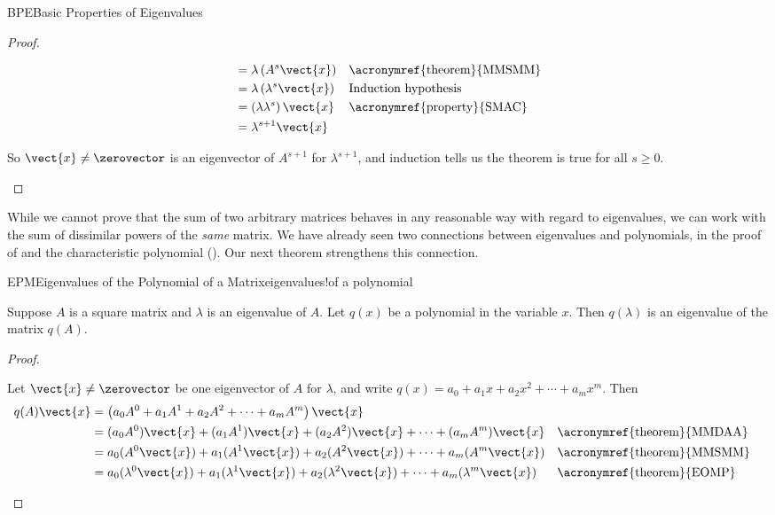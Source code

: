 \begin{subsect}{BPE}{Basic Properties of Eigenvalues}
\begin{proof}
\begin{para}
\begin{align*}
&=\lambda\left(A^s\vect{x}\right)&&\text{\acronymref{theorem}{MMSMM}}\\
&=\lambda\left(\lambda^s\vect{x}\right)&&\text{Induction hypothesis}\\
&=\left(\lambda\lambda^s\right)\vect{x}&&\text{\acronymref{property}{SMAC}}\\
&=\lambda^{s+1}\vect{x}
\end{align*}
\end{para}
%
\begin{para}So $\vect{x}\neq\zerovector$ is an eigenvector of $A^{s+1}$ for $\lambda^{s+1}$, and induction tells us the theorem is true for all $s\geq 0$.\end{para}
%
\end{proof}
%
\begin{para}While we cannot prove that the sum of two arbitrary matrices behaves in any reasonable way with regard to eigenvalues, we can work with the sum of dissimilar powers of the {\em same} matrix.  We have already seen two connections between eigenvalues and polynomials, in the proof of  and the characteristic polynomial ().  Our next theorem strengthens this connection.\end{para}
%
\begin{theorem}{EPM}{Eigenvalues of the Polynomial of a Matrix}{eigenvalues!of a polynomial}
\begin{para}Suppose $A$ is a square matrix and $\lambda$ is an eigenvalue of $A$.  Let $q(x)$ be a polynomial in the variable $x$.  Then $q(\lambda)$ is an eigenvalue of the matrix $q(A)$.\end{para}
\end{theorem}
%
\begin{proof}
%
\begin{para}Let $\vect{x}\neq\zerovector$ be one eigenvector of $A$ for $\lambda$, and write $q(x)=a_0+a_1x+a_2x^2+\cdots+a_mx^m$.  Then
%
\begin{align*}
q(A)\vect{x}&=\left(a_0A^0+a_1A^1+a_2A^2+\cdots+a_mA^m\right)\vect{x}\\
&=(a_0A^0)\vect{x}+(a_1A^1)\vect{x}+(a_2A^2)\vect{x}+\cdots+(a_mA^m)\vect{x}&&\text{\acronymref{theorem}{MMDAA}}\\
&=a_0(A^0\vect{x})+a_1(A^1\vect{x})+a_2(A^2\vect{x})+\cdots+a_m(A^m\vect{x})&&\text{\acronymref{theorem}{MMSMM}}\\
&=a_0(\lambda^0\vect{x})+a_1(\lambda^1\vect{x})+a_2(\lambda^2\vect{x})+\cdots+a_m(\lambda^m\vect{x})&&\text{\acronymref{theorem}{EOMP}}\\

\end{align*}
\end{para}
\end{proof}
\end{subsect}
